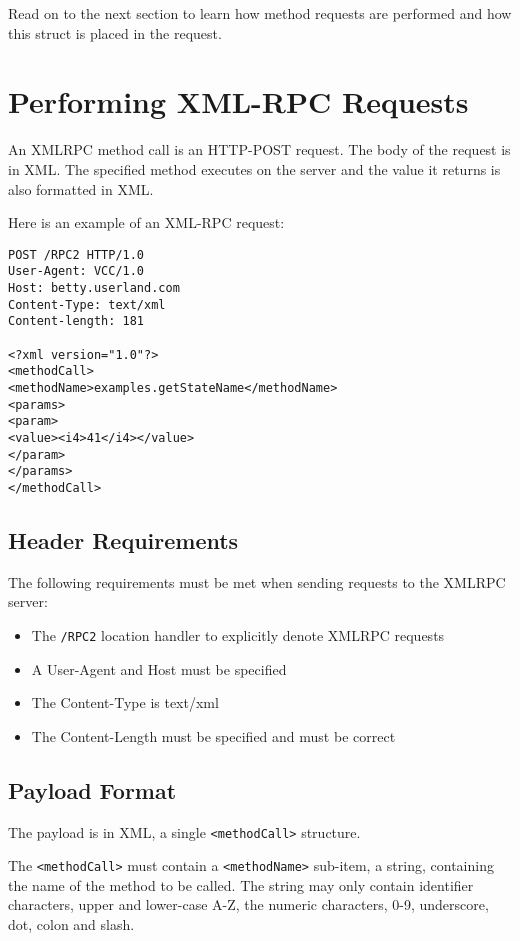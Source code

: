 Read on to the next section to learn how method requests are performed and how
this struct is placed in the request.


\section{Performing XML-RPC Requests}

An XMLRPC method call is an HTTP-POST request. The body of the request is in
XML. The specified method executes on the server and the value it returns is
also formatted in XML.

Here is an example of an XML-RPC request:

\begin{verbatim}
POST /RPC2 HTTP/1.0
User-Agent: VCC/1.0
Host: betty.userland.com
Content-Type: text/xml
Content-length: 181

<?xml version="1.0"?>
<methodCall>
<methodName>examples.getStateName</methodName>
<params>
<param>
<value><i4>41</i4></value>
</param>
</params>
</methodCall>
\end{verbatim}


\subsection{Header Requirements}

The following requirements must be met when sending requests to the XMLRPC
server:

\begin{itemize}
\item The \texttt{/RPC2} location handler to explicitly denote XMLRPC requests
\item A User-Agent and Host must be specified
\item The Content-Type is text/xml
\item The Content-Length must be specified and must be correct
\end{itemize}


\subsection{Payload Format}

The payload is in XML, a single \texttt{<methodCall>} structure.

The \texttt{<methodCall>} must contain a \texttt{<methodName>} sub-item, a
string, containing the name of the method to be called. The string may only
contain identifier characters, upper and lower-case A-Z, the numeric
characters, 0-9, underscore, dot, colon and slash.

